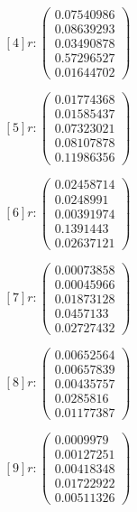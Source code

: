 \documentclass{article}
\begin{document}
$$ [4] r: \left(\begin{matrix}
    0.07540986 \\
    0.08639293 \\
    0.03490878 \\
    0.57296527 \\
    0.01644702
\end{matrix}\right) $$
   
   
$$ [5] r: \left(\begin{matrix}
    0.01774368 \\
    0.01585437 \\
    0.07323021 \\
    0.08107878 \\
    0.11986356
\end{matrix}\right) $$
   
    
$$ [6] r:\left(\begin{matrix}
    0.02458714 \\
    0.0248991  \\
    0.00391974 \\
    0.1391443  \\
    0.02637121
\end{matrix}\right) $$
   
   
$$ [7] r: \left(\begin{matrix}
    0.00073858 \\
    0.00045966 \\
    0.01873128 \\
    0.0457133  \\
    0.02727432
\end{matrix}\right) $$
   
   
   
 $$ [8] r: \left(\begin{matrix}
    0.00652564 \\
    0.00657839 \\
    0.00435757 \\
    0.0285816  \\
    0.01177387
\end{matrix}\right) $$
   
   
   
$$ [9] r: \left(\begin{matrix}
    0.0009979  \\
    0.00127251 \\
    0.00418348 \\
    0.01722922 \\
    0.00511326
\end{matrix}\right) $$
   
\end{document}
